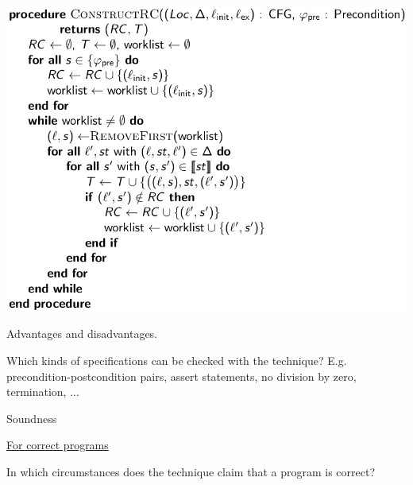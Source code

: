 \documentclass[a4paper]{article}
\begin{document}
\begin{minipage}[t]{0.16\linewidth}
\begin{betterlist}
{{				\includegraphics[width=0.7\linewidth]{./figures/explicit_state.png}
			}}
    \item Advantages and disadvantages.
		\item Which kinds of specifications can be checked with the technique? E.g. precondition-postcondition pairs, assert statements, no division by zero, termination, ...

		\item \alert{Soundness}
		\begin{betterlist}
			\item \underline{For correct programs}
			\begin{betterlist}
				\item In which circumstances does the technique claim that a program is correct?


\end{betterlist}
\end{betterlist}
\end{betterlist}
\end{minipage}
\end{document}
